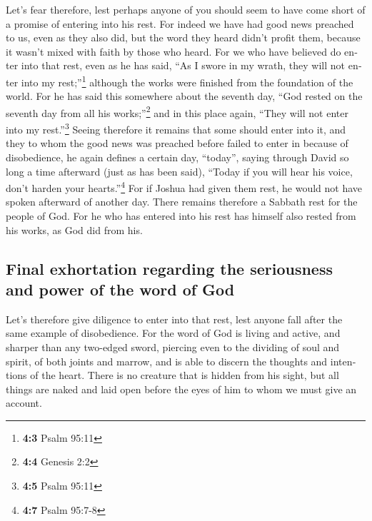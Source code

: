 \begin{paracol}{2}
\begin{otherlanguage}{english}
 Let's fear therefore, lest perhaps anyone of you should
seem to have come short of a promise of entering into his rest.
 For indeed we have had good news preached to us, even as
they also did, but the word they heard didn't profit them, because it
wasn't mixed with faith by those who heard.  For we who
have believed do enter into that rest, even as he has said, ``As I swore
in my wrath, they will not enter into my rest;''\footnote{\textbf{4:3}
  Psalm 95:11} although the works were finished from the foundation of
the world.  For he has said this somewhere about the
seventh day, ``God rested on the seventh day from all his
works;''\footnote{\textbf{4:4} Genesis 2:2}  and in this
place again, ``They will not enter into my rest.''\footnote{\textbf{4:5}
  Psalm 95:11}  Seeing therefore it remains that some
should enter into it, and they to whom the good news was preached before
failed to enter in because of disobedience,  he again
defines a certain day, ``today'', saying through David so long a time
afterward (just as has been said), ``Today if you will hear his voice,
don't harden your hearts.''\footnote{\textbf{4:7} Psalm 95:7-8}
 For if Joshua had given them rest, he would not have
spoken afterward of another day.  There remains therefore
a Sabbath rest for the people of God.  For he who has
entered into his rest has himself also rested from his works, as God did
from his.

\hypertarget{final-exhortation-regarding-the-seriousness-and-power-of-the-word-of-god}{%
\subsection{Final exhortation regarding the seriousness and power of the
word of
God}\label{final-exhortation-regarding-the-seriousness-and-power-of-the-word-of-god}}

 Let's therefore give diligence to enter into that rest,
lest anyone fall after the same example of disobedience. 
For the word of God is living and active, and sharper than any two-edged
sword, piercing even to the dividing of soul and spirit, of both joints
and marrow, and is able to discern the thoughts and intentions of the
heart.  There is no creature that is hidden from his
sight, but all things are naked and laid open before the eyes of him to
whom we must give an account.


\end{otherlanguage}
\end{paracol}
